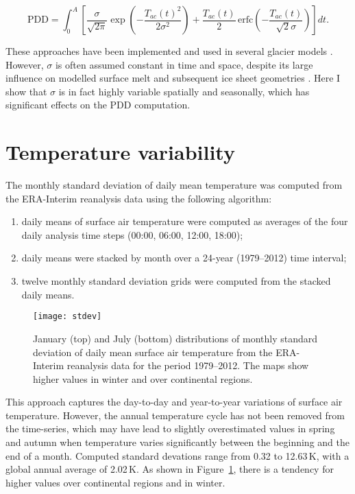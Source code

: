 \documentclass[review]{igs}
\begin{document}
\begin{equation} \label{eq:calovgreve}
  \mathrm{PDD} = \int_{0}^{A} \left[
    \frac{\sigma}{\sqrt{2\pi}}
    \exp\left({-\frac{T_{ac}(t)^2}{2\sigma^2}}\right)
    +\frac{T_{ac}(t)}{2} \,
    \mathrm{erfc} \left(-\frac{T_{ac}(t)}{\sqrt{2}\sigma}\right)
  \right]dt.
\end{equation}

These approaches have been implemented and used in several glacier models \citep[e.g.][]{letreguilly-etal-1991,greve-1997,seddik-etal-2012,charbit-etal-2013}. However, $\sigma$ is often assumed constant in time and space, despite its large influence on modelled surface melt and subsequent ice sheet geometries \citep{charbit-etal-2013}. Here I show that $\sigma$ is in fact highly variable spatially and seasonally, which has significant effects on the PDD computation.


\section{Temperature variability}

The monthly standard deviation of daily mean temperature was computed from the ERA-Interim reanalysis \citep{data:erai} data using the following algorithm:

\begin{enumerate}
  \item daily means of surface air temperature were computed as averages of the four daily analysis time steps (00:00, 06:00, 12:00, 18:00);
  \item daily means were stacked by month over a 24-year (1979--2012) time interval;
  \item twelve monthly standard deviation grids were computed from the stacked daily means.
\end{enumerate}

\begin{figure}
  \centering\texttt{[image: stdev]}
  \caption{January (top) and July (bottom) distributions of monthly standard deviation of daily mean surface air temperature from the ERA-Interim reanalysis \citep{data:erai} data for the period 1979--2012. The maps show higher values in winter and over continental regions.}
  \label{fig:stdev}
\end{figure}

This approach captures the day-to-day and year-to-year variations of surface air temperature. However, the annual temperature cycle has not been removed from the time-series, which may have lead to slightly overestimated values in spring and autumn when temperature varies significantly between the beginning and the end of a month. Computed standard devations range from 0.32 to 12.63\,K, with a global annual average of 2.02\,K. As shown in Figure~\ref{fig:stdev}, there is a tendency for higher values over continental regions and in winter.
\end{document}
